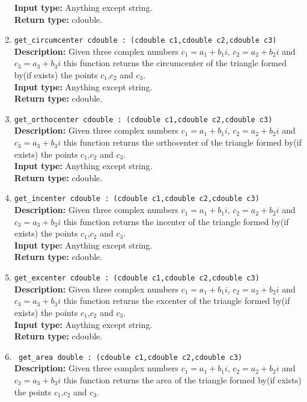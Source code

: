 \documentclass[12pt]{article}
\begin{document}
\begin{enumerate}
    \textbf{Input type:} Anything except string. \\
    \textbf{Return type:} cdouble.
    \item \texttt{get\_circumcenter cdouble : (cdouble c1,cdouble c2,cdouble c3)} \\
    \textbf{Description:} Given three complex numbers $c_1=a_1+b_1i$, $c_2=a_2+b_2i$ and $c_3=a_3+b_3i$ this function returns the circumcenter of the triangle formed by(if exists) the points $c_1$,$c_2$ and $c_3$.\\
    \textbf{Input type:} Anything except string. \\
    \textbf{Return type:} cdouble.
    \item \texttt{get\_orthocenter cdouble : (cdouble c1,cdouble c2,cdouble c3)} \\
    \textbf{Description:} Given three complex numbers $c_1=a_1+b_1i$, $c_2=a_2+b_2i$ and $c_3=a_3+b_3i$ this function returns the orthocenter of the triangle formed by(if exists) the points $c_1$,$c_2$ and $c_3$.\\
    \textbf{Input type:} Anything except string. \\
    \textbf{Return type:} cdouble.
    \item \texttt{get\_incenter cdouble : (cdouble c1,cdouble c2,cdouble c3)} \\
    \textbf{Description:} Given three complex numbers $c_1=a_1+b_1i$, $c_2=a_2+b_2i$ and $c_3=a_3+b_3i$ this function returns the incenter of the triangle formed by(if exists) the points $c_1$,$c_2$ and $c_3$.\\
    \textbf{Input type:} Anything except string. \\
    \textbf{Return type:} cdouble.
    \item \texttt{get\_excenter cdouble : (cdouble c1,cdouble c2,cdouble c3)} \\ 
    \textbf{Description:} Given three complex numbers $c_1=a_1+b_1i$, $c_2=a_2+b_2i$ and $c_3=a_3+b_3i$ this function returns the excenter of the triangle formed by(if exists) the points $c_1$,$c_2$ and $c_3$.\\
    \textbf{Input type:} Anything except string. \\
    \textbf{Return type:} cdouble.
    \item \texttt{ get\_area double : (cdouble c1,cdouble c2,cdouble c3)} \\ 
    \textbf{Description:} Given three complex numbers $c_1=a_1+b_1i$, $c_2=a_2+b_2i$ and $c_3=a_3+b_3i$ this function returns the area of the triangle formed by(if exists) the points $c_1$,$c_2$ and $c_3$.\\

\end{enumerate}
\end{document}
